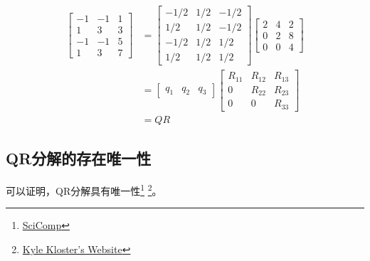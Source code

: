 \begin{example}
    $$
\begin{aligned}
\left[\begin{array}{rrr}
-1 & -1 & 1 \\
1 & 3 & 3 \\
-1 & -1 & 5 \\
1 & 3 & 7
\end{array}\right] &=\left[\begin{array}{rrr}
-1 / 2 & 1 / 2 & -1 / 2 \\
1 / 2 & 1 / 2 & -1 / 2 \\
-1 / 2 & 1 / 2 & 1 / 2 \\
1 / 2 & 1 / 2 & 1 / 2
\end{array}\right]\left[\begin{array}{rrr}
2 & 4 & 2 \\
0 & 2 & 8 \\
0 & 0 & 4
\end{array}\right] \\
&=\left[\begin{array}{lll}
q_{1} & q_{2} & q_{3}
\end{array}\right]\left[\begin{array}{ccc}
R_{11} & R_{12} & R_{13} \\
0 & R_{22} & R_{23} \\
0 & 0 & R_{33}
\end{array}\right] \\
&=Q R
\end{aligned}
$$
\end{example}

\subsection{QR分解的存在唯一性}

可以证明，QR分解具有唯一性\footnote{\href{http://math.ecnu.edu.cn/~jypan/Teaching/SciComp/}{SciComp}} \footnote{\href{https://www.math.purdue.edu/~kkloste/cs515fa14/qr-uniqueness.pdf}{Kyle Kloster's Website}}。




